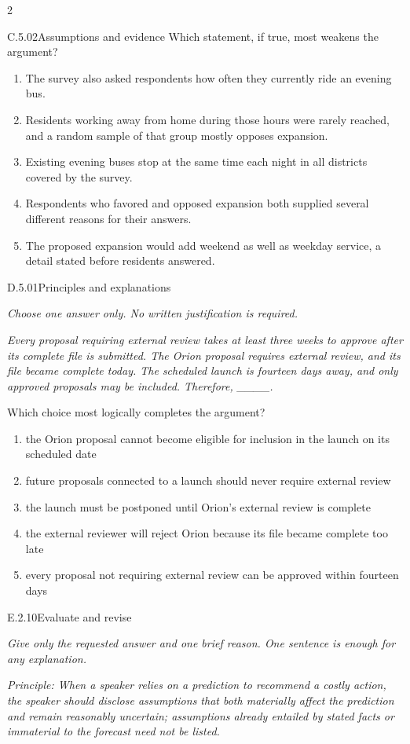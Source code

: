 \documentclass[9pt]{extarticle}
\newcommand{\choice}[1]{\item #1}
\begin{document}
\begin{multicols}{2}
\begin{DenseCoreProblem}{C.5.02}{Assumptions and evidence}
Which statement, if true, most weakens the argument?
\begin{enumerate}[label=(\alph*)]
  \choice{The survey also asked respondents how often they currently ride an evening bus.}
  \choice{Residents working away from home during those hours were rarely reached, and a random sample of that group mostly opposes expansion.}
  \choice{Existing evening buses stop at the same time each night in all districts covered by the survey.}
  \choice{Respondents who favored and opposed expansion both supplied several different reasons for their answers.}
  \choice{The proposed expansion would add weekend as well as weekday service, a detail stated before residents answered.}
\end{enumerate}
\end{DenseCoreProblem}
\begin{DenseCoreProblem}{D.5.01}{Principles and explanations}
{\scriptsize\textit{Choose one answer only. No written justification is required.}\par}
\emph{Every proposal requiring external review takes at least three weeks to approve after its complete file is submitted. The Orion proposal requires external review, and its file became complete today. The scheduled launch is fourteen days away, and only approved proposals may be included. Therefore, \_\_\_\_.}

Which choice most logically completes the argument?
\begin{enumerate}[label=(\alph*)]
  \choice{the Orion proposal cannot become eligible for inclusion in the launch on its scheduled date}
  \choice{future proposals connected to a launch should never require external review}
  \choice{the launch must be postponed until Orion's external review is complete}
  \choice{the external reviewer will reject Orion because its file became complete too late}
  \choice{every proposal not requiring external review can be approved within fourteen days}
\end{enumerate}
\end{DenseCoreProblem}
\begin{DenseCoreProblem}{E.2.10}{Evaluate and revise}
{\scriptsize\textit{Give only the requested answer and one brief reason. One sentence is enough for any explanation.}\par}
\emph{Principle: When a speaker relies on a prediction to recommend a costly action, the speaker should disclose assumptions that both materially affect the prediction and remain reasonably uncertain; assumptions already entailed by stated facts or immaterial to the forecast need not be listed.}


\end{DenseCoreProblem}
\end{multicols}
\end{document}
